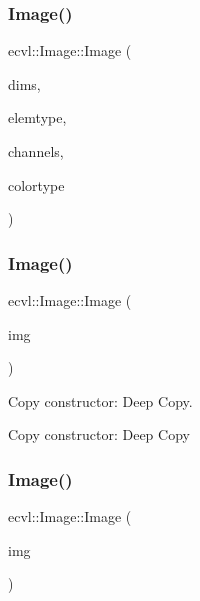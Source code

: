 \mbox{\label{classecvl_1_1_image_a6f2bb7cc6e702a7f5dfadbfe26a84bc9}} 
\subsubsection{Image()\hspace{0.1cm}{\footnotesize\ttfamily [2/4]}}
{\footnotesize\ttfamily ecvl\+::\+Image\+::\+Image (\begin{DoxyParamCaption}\item[{std\+::initializer\+\_\+list$<$ int $>$}]{dims,  }\item[{\textbf{ Data\+Type}}]{elemtype,  }\item[{std\+::string}]{channels,  }\item[{\textbf{ Color\+Type}}]{colortype }\end{DoxyParamCaption})\hspace{0.3cm}{\ttfamily [inline]}}

\mbox{\label{classecvl_1_1_image_aca14b15a1e6bdbdceedad190b222fda4}} 
\subsubsection{Image()\hspace{0.1cm}{\footnotesize\ttfamily [3/4]}}
{\footnotesize\ttfamily ecvl\+::\+Image\+::\+Image (\begin{DoxyParamCaption}\item[{const \textbf{ Image} \&}]{img }\end{DoxyParamCaption})\hspace{0.3cm}{\ttfamily [inline]}}



Copy constructor\+: Deep Copy. 

Copy constructor\+: Deep Copy \mbox{\label{classecvl_1_1_image_a70fcbb845cf9e5571abf1f9ca396b0ea}} 
\subsubsection{Image()\hspace{0.1cm}{\footnotesize\ttfamily [4/4]}}
{\footnotesize\ttfamily ecvl\+::\+Image\+::\+Image (\begin{DoxyParamCaption}\item[{\textbf{ Image} \&\&}]{img }\end{DoxyParamCaption})\hspace{0.3cm}{\ttfamily [inline]}}



